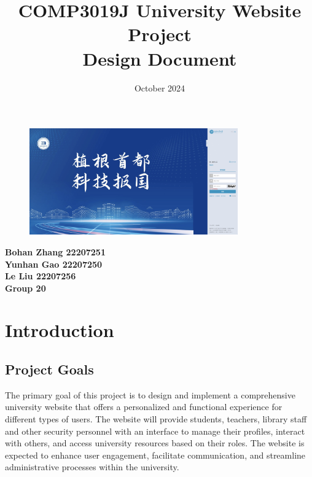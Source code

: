 \documentclass[12pt]{article}
\title{COMP3019J University Website Project\\ \Large Design Document}
\date{October 2024}
\begin{document}
\maketitle
\vspace{2cm}
\begin{figure}[h]  %
  \centering
  \includegraphics[width=0.8\textwidth]{title.png}  %
\end{figure}

\vspace{4cm}

\begin{center}
  \textbf{Bohan Zhang 22207251}\\
  \textbf{Yunhan Gao 22207250}\\
  \textbf{Le Liu 22207256}\\
  \vspace{0.5cm}  %
  \textbf{Group  20}\\  %
  \vspace{0.5cm}

\end{center}

\thispagestyle{empty}
\newpage

\tableofcontents
\newpage


\section{Introduction}

\subsection{Project Goals}
The primary goal of this project is to design and implement a comprehensive university website that offers a personalized
 and functional experience for different types of users. The website will provide students, teachers, library staff and other security personnel with an interface to manage their profiles, interact with others, and access university resources based on their 
 roles. The website is expected to enhance user engagement, facilitate communication, and streamline administrative processes 
 within the university. 
\end{document}
